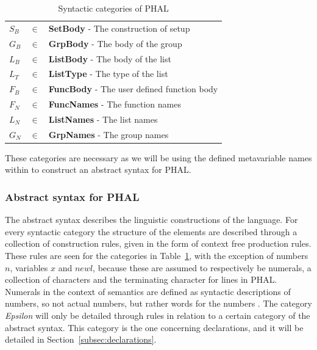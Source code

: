 \begin{table}[H]
\begin{tabular}{@{}lll@{}}
$S_B$       & $\in$ & \textbf{SetBody} - The construction of setup      \\
$G_B$       & $\in$ & \textbf{GrpBody} - The body of the group \\
$L_B$       & $\in$ & \textbf{ListBody} - The body of the list \\
$L_T$       & $\in$ & \textbf{ListType} - The type of the list \\
$F_B$      & $\in$ &  \textbf{FuncBody} - The user defined function body  \\ 
$F_N$      & $\in$ &  \textbf{FuncNames} - The function names  \\
$L_N$      & $\in$ &  \textbf{ListNames} - The list names  \\
$G_N$      & $\in$ &  \textbf{GrpNames} - The group names  \\\bottomrule
\end{tabular}
\caption{Syntactic categories of PHAL}
\label{tab:syntacticcategories}
\end{table}
\noindent
These categories are necessary as we will be using the defined metavariable names within to construct an abstract syntax for PHAL.


\subsubsection{Abstract syntax for PHAL}
The abstract syntax describes the linguistic constructions of the language.
For every syntactic category the structure of the elements are described through a collection of construction rules, given in the form of context free production rules. 
These rules are seen for the categories in Table~\ref{tab:syntacticcategories}, with the exception of numbers $n$, variables $x$ and $newl$, because these are assumed to respectively be numerals, a collection of characters and the terminating character for lines in PHAL. 
Numerals in the context of semantics are defined as syntactic descriptions of numbers, so not actual numbers, but rather words for the numbers \cite{PilenVedTraeetsRod}. 
The category \textit{Epsilon} will only be detailed through rules in relation to a certain category of the abstract syntax. 
This category is the one concerning declarations, and it will be detailed in Section~\ref{subsec:declarations}.


